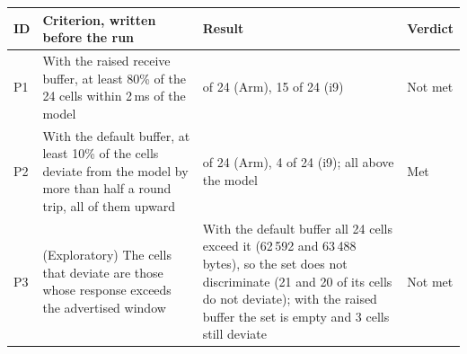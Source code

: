\documentclass[preprint,12pt]{elsarticle}
\newcommand{\ms}{\,ms\xspace}
\begin{document}
\begin{center}\begin{minipage}{\textwidth}\footnotesize\captionsetup{justification=raggedright,singlelinecheck=off}
\label{tab:prereg_g3b}
\renewcommand{\arraystretch}{1.12}
\begin{tabularx}{\textwidth}{@{}>{\raggedright\arraybackslash}p{}>{\raggedright\arraybackslash}X>{\raggedright\arraybackslash}X>{\raggedright\arraybackslash}p{}@{}}
\toprule
ID & Criterion, written before the run & Result & Verdict \\
\midrule
P1 & With the raised receive buffer, at least 80\% of the 24 cells within 2\ms of the model & 2 of 24 (Arm), 15 of 24 (i9) & Not met \\
P2 & With the default buffer, at least 10\% of the cells deviate from the model by more than half a round trip, all of them upward & 3 of 24 (Arm), 4 of 24 (i9); all above the model & Met \\
P3 & (Exploratory) The cells that deviate are those whose response exceeds the advertised window & With the default buffer all 24 cells exceed it (62\,592 and 63\,488 bytes), so the set does not discriminate (21 and 20 of its cells do not deviate); with the raised buffer the set is empty and 3 cells still deviate & Not met \\
\bottomrule
\end{tabularx}
\end{minipage}\end{center}
\end{document}
